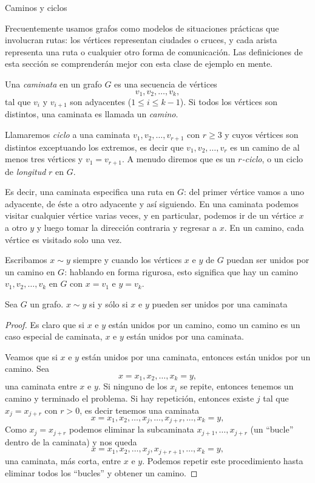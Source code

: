 \begin{section}{Caminos y ciclos}\label{seccion-caminos-y-ciclos}

Frecuentemente usamos grafos como modelos de situaciones prácticas que involucran rutas: los vértices representan ciudades o cruces, y cada arista representa una ruta o cualquier otro forma de comunicación. Las definiciones de esta sección se comprenderán mejor con esta clase de ejemplo en mente.

\begin{definicion}  Una \textit{caminata} en un grafo $G$ es   una secuencia de vértices
$$
v_1,v_2,\ldots,v_k,
$$
tal que $v_i$ y $v_{i+1}$ son adyacentes ($1 \le i \le k-1$). Si todos los vértices son distintos, una caminata es llamada un \textit{camino}.  

Llamaremos \textit{ciclo} a una caminata  $v_1,v_2,\ldots,v_{r+1}$  con $r \ge 3$ y cuyos vértices son distintos exceptuando los extremos, es decir que $v_1,v_2,\ldots,v_{r}$ es un camino de al menos tres vértices y $v_1=v_{r+1}$.  A menudo diremos que es un \textit{$r$-ciclo}, o un ciclo de \textit{longitud} $r$ en $G$.  
\end{definicion}

Es decir, una caminata especifica una ruta en $G$: del primer vértice vamos a uno adyacente, de éste a otro adyacente y así siguiendo. En una caminata podemos visitar cualquier vértice varias veces, y en particular, podemos ir de un vértice $x$ a otro $y$ y luego tomar la dirección contraria y regresar a $x$. En un camino, cada vértice es visitado solo una vez.

Escribamos $x \sim y$ siempre y cuando los vértices $x$ e $y$ de $G$ puedan ser unidos por un camino en $G$: hablando en forma rigurosa, esto significa que hay un camino $v_1,v_2,\ldots,v_k$ en $G$ con $x=v_1$ e $y=v_k$. 

\begin{lema} Sea $G$ un grafo. $x \sim y$ si  y sólo si $x$ e $y$ pueden ser unidos por una caminata 
\end{lema}
\begin{proof}Es claro que si $x$ e $y$ están unidos por un camino, como  un camino es un caso especial de caminata, $x$ e $y$ están unidos por una caminata.

Veamos que si  $x$ e $y$ están unidos por una caminata, entonces están unidos por un camino. Sea 
$$
x=x_1,x_2,\ldots,x_k=y,
$$
una caminata entre  $x$ e $y$. Si ninguno de los $x_i$ se repite, entonces tenemos un camino y terminado el problema. Si hay repetición, entonces existe $j$ tal que $x_j = x_{j+r}$ con $r >0$, es decir tenemos una caminata
$$
x=x_1,x_2,\ldots,x_j,\ldots,x_{j+r},\ldots, x_k=y,
$$
Como $x_j = x_{j+r}$ podemos eliminar la subcaminata $x_{j+1},\ldots,x_{j+r}$ (un ``bucle'' dentro de la caminata) y nos queda 
$$
x=x_1,x_2,\ldots,x_j,x_{j+r+1},\ldots, x_k=y,
$$
una caminata, más corta,  entre $x$ e $y$. Podemos repetir este procedimiento hasta eliminar todos los ``bucles'' y obtener un camino.
\end{proof}


\end{section}
